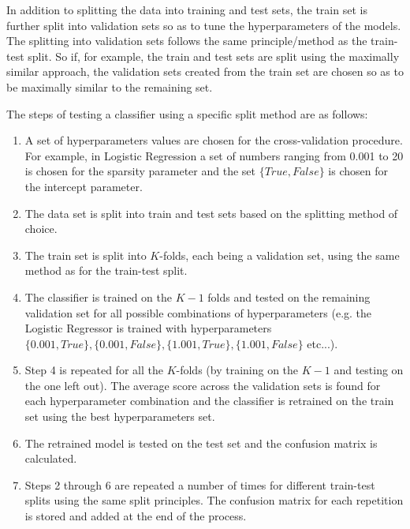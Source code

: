 In addition to splitting the data into training and test sets, the train set is further split into validation sets so as to tune the hyperparameters of the models. The splitting into validation sets follows the same principle/method as the train-test split. So if, for example, the train and test sets are split using the maximally similar approach, the validation sets created from the train set are chosen so as to be maximally similar to the remaining set.


The steps of testing a classifier using a specific split method are as follows:
\begin{enumerate}
\item A set of hyperparameters values are chosen for the cross-validation procedure. For example, in Logistic Regression a set of numbers ranging from 0.001 to 20 is chosen for the sparsity parameter and the set $\{True,False\}$ is chosen for the intercept parameter.
\item The data set is split into train and test sets based on the splitting method of choice. 
\item The train set is split into $K$-folds, each being a validation set, using the same method as for the train-test split. 
\item The classifier is trained on the $K-1$ folds and tested on the remaining validation set for all possible combinations of hyperparameters (e.g. the Logistic Regressor is trained with hyperparameters $\{0.001,True\},\{0.001,False\},\{1.001,True\},\{1.001,False\}$ etc...).
\item Step 4 is repeated for all the $K$-folds (by training on the $K-1$ and testing on the one left out). The average score across the validation sets is found for each hyperparameter combination and the classifier is retrained on the train set using the best hyperparameters set.
\item The retrained model is tested on the test set and the confusion matrix is calculated.
\item Steps  2 through 6 are repeated a number of times for different train-test splits using the same split principles. The confusion matrix for each repetition is stored and added at the end of the process.  
\end{enumerate}

